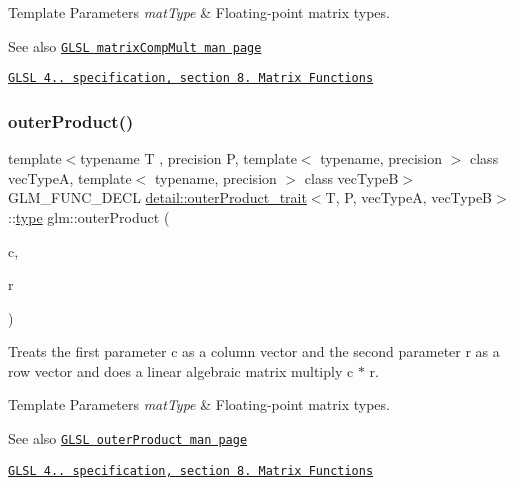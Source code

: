 \begin{DoxyTemplParams}{Template Parameters}
{\em mat\+Type} & Floating-\/point matrix types.\\
\hline
\end{DoxyTemplParams}
\begin{DoxySeeAlso}{See also}
\href{http://www.opengl.org/sdk/docs/manglsl/xhtml/matrixCompMult.xml}{\tt G\+L\+SL matrix\+Comp\+Mult man page} 

\href{http://www.opengl.org/registry/doc/GLSLangSpec.4.20.8.pdf}{\tt G\+L\+SL 4.. specification, section 8. Matrix Functions} 
\end{DoxySeeAlso}
\mbox{\label{group__core__func__matrix_gae9f513dc8e4f3ceb993669321b6d0f09}} 
\subsubsection{\texorpdfstring{outer\+Product()}{outerProduct()}}
{\footnotesize\ttfamily template$<$typename T , precision P, template$<$ typename, precision $>$ class vec\+TypeA, template$<$ typename, precision $>$ class vec\+TypeB$>$ \\
G\+L\+M\+\_\+\+F\+U\+N\+C\+\_\+\+D\+E\+CL \hyperlink{structglm_1_1detail_1_1outerProduct__trait}{detail\+::outer\+Product\+\_\+trait}$<$T, P, vec\+TypeA, vec\+TypeB$>$\+::\hyperlink{structglm_1_1type}{type} glm\+::outer\+Product (\begin{DoxyParamCaption}\item[{vec\+TypeA$<$ T, P $>$ const \&}]{c,  }\item[{vec\+TypeB$<$ T, P $>$ const \&}]{r }\end{DoxyParamCaption})}

Treats the first parameter c as a column vector and the second parameter r as a row vector and does a linear algebraic matrix multiply c $\ast$ r.


\begin{DoxyTemplParams}{Template Parameters}
{\em mat\+Type} & Floating-\/point matrix types.\\
\hline
\end{DoxyTemplParams}
\begin{DoxySeeAlso}{See also}
\href{http://www.opengl.org/sdk/docs/manglsl/xhtml/outerProduct.xml}{\tt G\+L\+SL outer\+Product man page} 

\href{http://www.opengl.org/registry/doc/GLSLangSpec.4.20.8.pdf}{\tt G\+L\+SL 4.. specification, section 8. Matrix Functions} 
\end{DoxySeeAlso}
